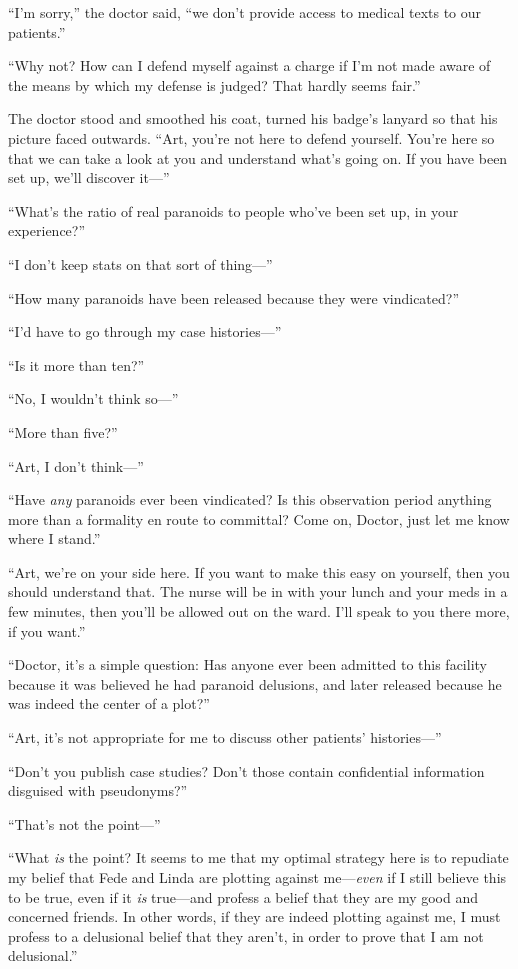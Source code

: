 “I’m sorry,” the doctor said, “we don’t provide access to medical
texts to our patients.”

“Why not? How can I defend myself against a charge if I’m not made
aware of the means by which my defense is judged? That hardly seems
fair.”

The doctor stood and smoothed his coat, turned his badge’s lanyard
so that his picture faced outwards. “Art, you’re not here to defend
yourself. You’re here so that we can take a look at you and
understand what’s going on. If you have been set up, we’ll discover
it—”

“What’s the ratio of real paranoids to people who’ve been set up,
in your experience?”

“I don’t keep stats on that sort of thing—”

“How many paranoids have been released because they were
vindicated?”

“I’d have to go through my case histories—”

“Is it more than ten?”

“No, I wouldn’t think so—”

“More than five?”

“Art, I don’t think—”

“Have \emph{any} paranoids ever been vindicated? Is this
observation period anything more than a formality en route to
committal? Come on, Doctor, just let me know where I stand.”

“Art, we’re on your side here. If you want to make this easy on
yourself, then you should understand that. The nurse will be in
with your lunch and your meds in a few minutes, then you’ll be
allowed out on the ward. I’ll speak to you there more, if you
want.”

“Doctor, it’s a simple question: Has anyone ever been admitted to
this facility because it was believed he had paranoid delusions,
and later released because he was indeed the center of a plot?”

“Art, it’s not appropriate for me to discuss other patients’
histories—”

“Don’t you publish case studies? Don’t those contain confidential
information disguised with pseudonyms?”

“That’s not the point—”

“What \emph{is} the point? It seems to me that my optimal strategy
here is to repudiate my belief that Fede and Linda are plotting
against me—\emph{even} if I still believe this to be true, even if
it \emph{is} true—and profess a belief that they are my good and
concerned friends. In other words, if they are indeed plotting
against me, I must profess to a delusional belief that they aren’t,
in order to prove that I am not delusional.”

